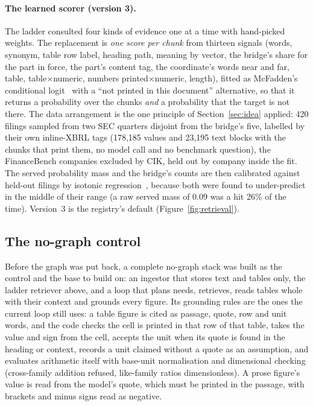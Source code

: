 \paragraph{The learned scorer (version 3).}
The ladder consulted four kinds of evidence one at a time with hand-picked weights. The replacement is \emph{one score per chunk} from thirteen signals (words, synonym, table row label, heading path, meaning by vector, the bridge's share for the part in force, the part's content tag, the coordinate's words near and far, table, table$\times$numeric, numbers printed$\times$numeric, length), fitted as McFadden's conditional logit~\citep{mcfadden1974} with a ``not printed in this document'' alternative, so that it returns a probability over the chunks \emph{and} a probability that the target is not there. The data arrangement is the one principle of Section~\ref{sec:idea} applied: 420 filings sampled from two SEC quarters disjoint from the bridge's five, labelled by their own inline-XBRL tags (178,185 values and 23,195 text blocks with the chunks that print them, no model call and no benchmark question), the FinanceBench companies excluded by CIK, held out by company inside the fit. The served probability mass and the bridge's counts are then calibrated against held-out filings by isotonic regression~\citep{zadrozny2002}, because both were found to under-predict in the middle of their range (a raw served mass of 0.09 was a hit 26\% of the time). Version~3 is the registry's default (Figure~\ref{fig:retrieval}).



\subsection{The no-graph control}
\label{sec:impl-nograph}

Before the graph was put back, a complete no-graph stack was built as the control and the base to build on: an ingestor that stores text and tables only, the ladder retriever above, and a loop that plans needs, retrieves, reads tables whole with their context and grounds every figure. Its grounding rules are the ones the current loop still uses: a table figure is cited as passage, quote, row and unit words, and the code checks the cell is printed in that row of that table, takes the value and sign from the cell, accepts the unit when its quote is found in the heading or context, records a unit claimed without a quote as an assumption, and evaluates arithmetic itself with base-unit normalisation and dimensional checking (cross-family addition refused, like-family ratios dimensionless). A prose figure's value is read from the model's quote, which must be printed in the passage, with brackets and minus signs read as negative.

